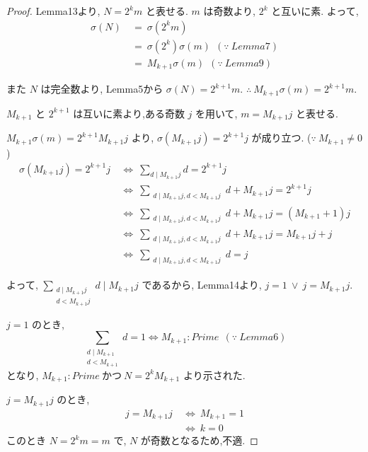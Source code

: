 \begin{proof}
Lemma13より, \(N = 2^km\) と表せる. \(m\) は奇数より, \(2^k\) と互いに素.
よって,
\begin{align*}
\sigma(N) ~&=~ \sigma(2^km)\\
          ~&=~ \sigma(2^k)\sigma(m)~~(\because~Lemma7)\\
          ~&=~ M_{k+1}\sigma(m)~~(\because~Lemma9)
\end{align*}

また \(N\) は完全数より, Lemma5から \(\sigma(N) = 2^{k+1}m\). \(\therefore~ M_{k+1}\sigma(m) = 2^{k+1}m\).

\(M_{k+1}\) と \(2^{k+1}\) は互いに素より,ある奇数 \(j\) を用いて, \(m = M_{k+1}j\) と表せる.

\(M_{k+1} \sigma(m) = 2^{k+1} M_{k+1}j\) より, \(\sigma(M_{k+1}j) = 2^{k+1}j\) が成り立つ. (\(\because~M_{k+1} \neq 0\))
\begin{align*}
\sigma(M_{k+1}j) = 2^{k+1}j ~&\Leftrightarrow~ \sum_{d \mid M_{k+1}j} d = 2^{k+1}j\\
                            ~&\Leftrightarrow~ \sum_{\substack{d \mid M_{k+1}j, d < M_{k+1}j}} d + M_{k+1}j = 2^{k+1}j\\
                            ~&\Leftrightarrow~ \sum_{\substack{d \mid M_{k+1}j, d < M_{k+1}j}} d + M_{k+1}j = (M_{k+1}+1)j\\
                            ~&\Leftrightarrow~ \sum_{\substack{d \mid M_{k+1}j, d < M_{k+1}j}} d + M_{k+1}j = M_{k+1}j + j\\
                            ~&\Leftrightarrow~ \sum_{\substack{d \mid M_{k+1}j, d < M_{k+1}j}} d = j
\end{align*}

よって, \(\sum_{\substack{d \mid M_{k+1}j\\ d < M_{k+1}j}} d \mid M_{k+1}j\) であるから, Lemma14より, \(j = 1 ~\vee~ j = M_{k+1}j\).

\(j = 1\) のとき,
\[
\sum_{\substack{d \mid M_{k+1}\\ d < M_{k+1}}} d = 1 \Leftrightarrow M_{k+1} : Prime~~(\because~Lemma6)
\]
となり, \(M_{k+1} : Prime ~\text{かつ} ~N = 2^kM_{k+1}\) より示された.

\(j = M_{k+1}j\) のとき,
\begin{align*}
j = M_{k+1}j ~&\Leftrightarrow~ M_{k+1} = 1\\
             ~&\Leftrightarrow~ k = 0
\end{align*}
このとき \(N = 2^km = m\) で, \(N\) が奇数となるため,不適.
\end{proof}


